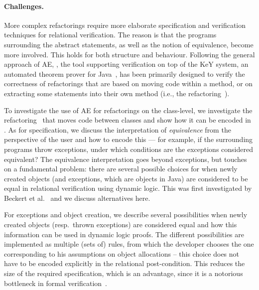 \paragraph{Challenges.}
More complex refactorings require more elaborate specification and verification techniques for relational verification. 
The reason is that the programs surrounding the abstract statements, as well as the notion of equivalence, become more involved.
This holds for both structure and behaviour.
Following the general approach of AE, \Refinity{} \cite{steinhoefel:ae}, the tool supporting verification on top of the KeY system, an automated theorem prover for Java~\cite{DBLP:conf/aplas/Steinhofel20},
has been primarily designed to verify the correctness of refactorings that are based on moving code within a method, or on extracting some statements into their own method (i.e., the  refactoring~\cite[p. 106]{fowler:refactoring2nd}).

To investigate the use of AE for refactorings on the class-level, we investigate the  refactoring~\cite[p. 189]{fowler:refactoring2nd} that moves code between classes and show how it can be encoded in \Refinity{}.
As for specification, we discuss the interpretation of \textit{equivalence} from the perspective of the user and how to encode this --- for example, if the surrounding programs throw exceptions, under which conditions are the exceptions considered equivalent?
The equivalence interpretation goes beyond exceptions, but touches on a fundamental problem:
there are several possible choices for when newly created objects (and exceptions, which are objects in Java) are considered to be equal in relational verification using dynamic logic.
This was first investigated by Beckert et al.~\cite{DBLP:conf/lopstr/BeckertBKSSU13} and we discuss alternatives here.


For exceptions and object creation, we describe several possibilities when newly created objects (resp.\ thrown exceptions) are considered equal
and how this information can be used in dynamic logic proofs. The different possibilities are implemented as 
multiple (sets of) rules, from which the developer chooses the one corresponding to his assumptions on object allocations -- this choice
does not have to be encoded explicitly in the relational post-condition.
This reduces the size of the required specification, which is an advantage, since it is a notorious bottleneck in formal verification~\cite{DBLP:journals/corr/abs-1211-6186,DBLP:series/lncs/HahnleH19}.


